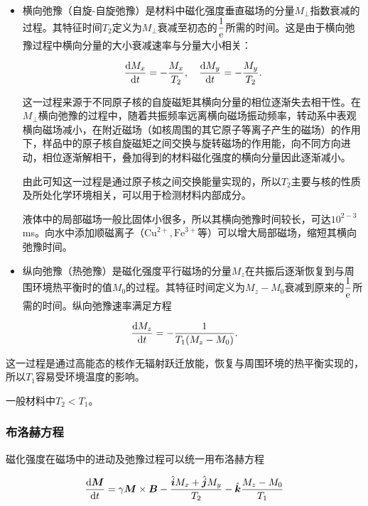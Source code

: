 \begin{itemize}

\item
  横向弛豫（自旋-自旋弛豫）是材料中磁化强度垂直磁场的分量\(M_{\perp}\)指数衰减的过程。其特征时间\(T_2\)定义为\(M_{\perp}\)衰减至初态的\(\dfrac{1}{\rm e}\)所需的时间。这是由于横向弛豫过程中横向分量的大小衰减速率与分量大小相关：

\begin{equation}
  \dfrac{{\rm d}M_x}{{\rm d}t}=-\dfrac{M_x}{T_2},\quad \dfrac{{\rm d}M_y}{{\rm d}t}=-\dfrac{M_y}{T_2}.
  \end{equation}

这一过程来源于不同原子核的自旋磁矩其横向分量的相位逐渐失去相干性。在\(M_{\perp}\)横向弛豫的过程中，随着共振频率远离横向磁场振动频率，转动系中表观横向磁场减小，在附近磁场（如核周围的其它原子等离子产生的磁场）的作用下，样品中的原子核自旋磁矩之间交换与旋转磁场的作用能，向不同方向进动，相位逐渐解相干，叠加得到的材料磁化强度的横向分量因此逐渐减小。

由此可知这一过程是通过原子核之间交换能量实现的，所以\(T_2\)主要与核的性质及所处化学环境相关，可以用于检测材料内部成分。

液体中的局部磁场一般比固体小很多，所以其横向弛豫时间较长，可达\(10^{2-3}\)ms。向水中添加顺磁离子（\(\mathrm{Cu}^{2+},\mathrm {Fe}^{3+}\)等）可以增大局部磁场，缩短其横向弛豫时间。

\item
  纵向弛豫（热弛豫）是磁化强度平行磁场的分量\(M_z\)在共振后逐渐恢复到与周围环境热平衡时的值\(M_0\)的过程。其特征时间定义为\(M_z-M_0\)衰减到原来的\(\dfrac{1}{\rm e}\)所需的时间。纵向弛豫速率满足方程
\end{itemize}

\begin{equation}
  \dfrac{{\rm d}M_z}{{\rm d}t}=-\dfrac{1}{T_1(M_z-M_0)}.
  \end{equation}

这一过程是通过高能态的核作无辐射跃迁放能，恢复与周围环境的热平衡实现的，所以\(T_1\)容易受环境温度的影响。

一般材料中\(T_2<T_1\)。

\subsubsection{布洛赫方程}\label{ux5e03ux6d1bux8d6bux65b9ux7a0b}

磁化强度在磁场中的进动及弛豫过程可以统一用布洛赫方程

\begin{equation}
  \dfrac{{\rm d}\boldsymbol{M}}{{\rm d}t} = \gamma\boldsymbol{M}\times\boldsymbol{B}-\dfrac{\hat{\boldsymbol{i}}M_x+\hat{\boldsymbol{j}}M_y}{T_2}-\hat{\boldsymbol{k}}\dfrac{M_z-M_0}{T_1}
\end{equation}

